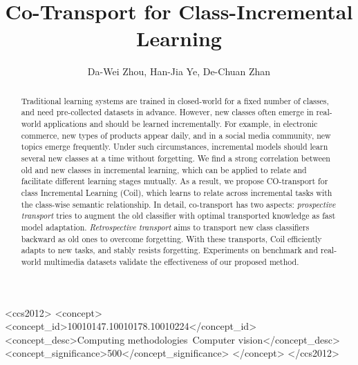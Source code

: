 \documentclass[sigconf]{acmart}
\newcommand{\name}{{\sc Coil }}
\newcommand{\mame}{{\sc Coil}}
\begin{document}
\title{Co-Transport for Class-Incremental Learning}



\author{Da-Wei Zhou, Han-Jia Ye, De-Chuan Zhan}

\begin{abstract}
	
	
	Traditional learning systems are trained in closed-world for a fixed number of classes, and need pre-collected datasets in advance. 
	However, new classes often emerge in real-world applications and should be learned incrementally. For example, in electronic commerce, new types of products appear daily, and in a social media community, new topics emerge frequently.
	Under such circumstances, incremental models should learn several new classes at a time without forgetting.
	We find a strong correlation between old and new classes in incremental learning, which can be applied to relate and facilitate different learning stages mutually.
	As a result, we propose CO-transport for class Incremental Learning (\mame), which learns to relate across incremental tasks with the class-wise semantic relationship. 
	In detail, co-transport has two aspects: \emph{prospective transport} tries to augment the old classifier with optimal transported knowledge as fast model adaptation. 
	\emph{Retrospective transport} aims to transport new class classifiers backward as old ones to overcome  forgetting. 
	With these transports,  \name efficiently adapts to new tasks, and stably resists forgetting.
	Experiments on benchmark and real-world multimedia datasets validate the effectiveness of our proposed method.
\end{abstract}


\begin{CCSXML}
	<ccs2012>
	<concept>
	<concept_id>10010147.10010178.10010224</concept_id>
	<concept_desc>Computing methodologies~Computer vision</concept_desc>
	<concept_significance>500</concept_significance>
	</concept>
	</ccs2012>
\end{CCSXML}



\maketitle
{}
\end{document}
